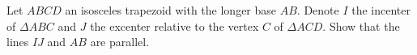 Let $ABCD$ an isosceles trapezoid with the longer base $AB$. Denote $I$ the incenter of $\Delta ABC$ and $J$ the excenter relative to the vertex $C$ of $\Delta ACD$. Show that the lines $IJ$ and $AB$ are parallel.